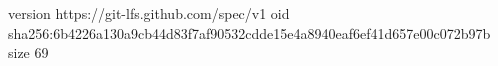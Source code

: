 version https://git-lfs.github.com/spec/v1
oid sha256:6b4226a130a9cb44d83f7af90532cdde15e4a8940eaf6ef41d657e00c072b97b
size 69
